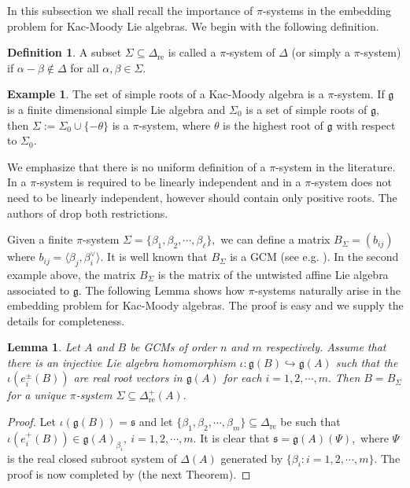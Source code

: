 \documentclass[12pt,reqno]{amsart}
\theoremstyle{plain}
\newtheorem{lem}{Lemma}
\theoremstyle{definition}
\newtheorem{example}{Example}
\newtheorem{defn}{Definition}
\theoremstyle{remark}
\newcommand{\lie}[1]{\mathfrak{#1}}
\begin{document}
In this subsection we shall recall the importance of $\pi$-systems in the embedding problem for Kac-Moody Lie algebras. We begin with the following definition.
\begin{defn}
    A subset $\Sigma\subseteq \Delta_{\mathrm{re}}$ is called a $\pi$-system of $\Delta$ (or simply a $\pi$-system) if $\alpha-\beta\notin \Delta$ for all $\alpha,\beta\in \Sigma.$
\end{defn}
\begin{example}
    The set of simple roots of a Kac-Moody algebra is a $\pi$-system. If $\lie g$ is a finite dimensional simple Lie algebra and $\Sigma_0$ is a set of simple roots of $\lie g,$ then $\Sigma:=\Sigma_0\cup\{-\theta\}$ is a $\pi$-system, where $\theta$ is the highest root of $\lie g$ with respect to $\Sigma_0.$ 
\end{example}

We emphasize that there is no uniform definition of a $\pi$-system in the literature. In \cite{dynkin1952semisimple} a $\pi$-system is required to be linearly independent and in \cite{feingold2004subalgebras} a $\pi$-system does not need to be linearly independent, however should contain only positive roots. The authors of \cite{carbone2021varvec} drop both restrictions. 

Given a finite $\pi$-system $\Sigma=\{\beta_1,\beta_2,\cdots,\beta_\ell\},$ we can define a matrix $B_\Sigma=(b_{ij})$ where $b_{ij}=\langle \beta_j,\beta_i^\vee \rangle.$ It  is well known that $B_\Sigma$ is a GCM (see e.g. \cite{carbone2021varvec}). In the second example above, the matrix $B_\Sigma$ is the matrix of the untwisted affine Lie algebra associated to $\lie g$. The following Lemma shows how $\pi$-systems naturally arise in the embedding problem for Kac-Moody algebras. The proof is easy and we supply the details for completeness.
\begin{lem}
    Let $A$ and $B$ be GCMs of order $n$ and $m$ respectively. Assume that there is an injective Lie algebra homomorphism $\iota:\lie g(B)\hookrightarrow \lie g(A)$ such that the $\iota(e_i^\pm(B))$ are real root vectors in $\lie g(A)$ for each $i=1,2,\cdots,m.$ Then $B=B_\Sigma$ for a unique $\pi$-system $\Sigma\subseteq \Delta^+_{\mathrm{re}}(A).$
\end{lem}
\begin{proof}
    Let $\iota(\lie g(B))=\lie s$ and let $\{\beta_1,\beta_2,\cdots,\beta_m\}\subseteq \Delta_{\mathrm{re}}$ be such that $\iota(e_i^+(B))\in \lie g(A)_{\beta_i},\ i=1,2,\cdots,m.$  It is clear that $\lie s=\lie g(A)(\Psi),$ where $\Psi$ is the real closed subroot system of $\Delta(A)$ generated by $\{\beta_i:i=1,2,\cdots,m\}$. The proof is now completed by \cite[Theorem 1]{habib2023root} (the next Theorem).
\end{proof}
\end{document}
